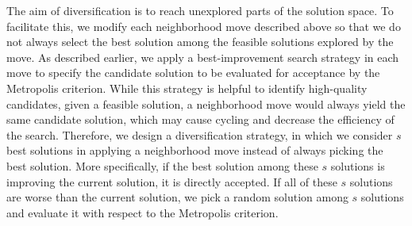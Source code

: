 \documentclass[11pt]{article}
\begin{document}
The aim of diversification is to reach unexplored parts of the solution space. To facilitate this, we modify each neighborhood move described above so that we do not always select the best solution among the feasible solutions explored by the move. As described earlier, we apply a best-improvement search strategy in each move to specify the candidate solution to be evaluated for acceptance by the Metropolis criterion. While this strategy is helpful to identify high-quality candidates, given a feasible solution, a neighborhood move would always yield the same candidate solution, which may cause cycling and decrease the efficiency of the search. Therefore, we design a diversification strategy, in which we consider $s$ best solutions in applying a neighborhood move instead of always picking the best solution. More specifically, if the best solution among these $s$ solutions is improving the current solution, it is directly accepted. If all of these $s$ solutions are worse than the current solution, we pick a random solution among $s$ solutions and evaluate it with respect to the Metropolis criterion.




\end{document}
